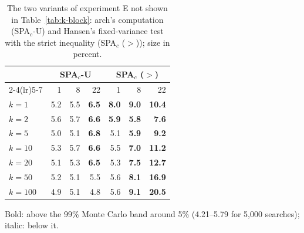 \begin{table}[t]
\centering
\footnotesize
\setlength{\tabcolsep}{3.5pt}
\caption{The two variants of experiment E not shown in Table~\ref{tab:k-block}: arch's computation (SPA$_c$-U) and Hansen's fixed-variance test with the strict inequality (SPA$_c$ ($>$)); size in percent.}
\label{tab:k-block-more}
\begin{tabular}{lrrrrrr}
\toprule
 & \multicolumn{3}{c}{SPA$_c$-U} & \multicolumn{3}{c}{SPA$_c$ ($>$)} \\
\cmidrule(lr){2-4}\cmidrule(lr){5-7}
 & 1 & 8 & 22 & 1 & 8 & 22 \\
\midrule
$k=1$ & 5.2 & 5.5 & \textbf{6.5} & \textbf{8.0} & \textbf{9.0} & \textbf{10.4} \\
$k=2$ & 5.6 & 5.7 & \textbf{6.6} & \textbf{5.9} & \textbf{5.8} & \textbf{7.6} \\
$k=5$ & 5.0 & 5.1 & \textbf{6.8} & 5.1 & \textbf{5.9} & \textbf{9.2} \\
$k=10$ & 5.3 & 5.7 & \textbf{6.6} & 5.5 & \textbf{7.0} & \textbf{11.2} \\
$k=20$ & 5.1 & 5.3 & \textbf{6.5} & 5.3 & \textbf{7.5} & \textbf{12.7} \\
$k=50$ & 5.2 & 5.1 & 5.5 & 5.6 & \textbf{8.1} & \textbf{16.9} \\
$k=100$ & 4.9 & 5.1 & 4.8 & 5.6 & \textbf{9.1} & \textbf{20.5} \\
\bottomrule
\end{tabular}
\par\smallskip\begin{minipage}{0.97\linewidth}\footnotesize Bold: above the 99\% Monte Carlo band around 5\% (4.21--5.79 for 5{,}000 searches); italic: below it.\end{minipage}
\end{table}

